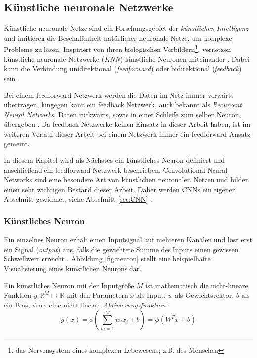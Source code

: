 \subsection{Künstliche neuronale Netzwerke}
\label{sec:KNN}
Künstliche neuronale Netze sind ein Forschungsgebiet der \textit{künstlichen Intelligenz} und imitieren die Beschaffenheit natürlicher neuronale Netze, um komplexe Probleme zu lösen. Inspiriert von ihren biologischen Vorbildern\footnote{das Nervensystem eines komplexen Lebewesens; z.B. des Menschen}, vernetzen künstliche neuronale Netzwerke (\textit{KNN}) künstliche Neuronen miteinander \cite{CS231nConvolutionalNeural}. Dabei kann die Verbindung unidirektional (\textit{feedforward}) oder bidirektional (\textit{feedback}) sein  \cite{Goodfellow-et-al-2016}. 

Bei einem feedforward Netzwerk werden die Daten im Netz immer vorwärts übertragen, hingegen kann ein feedback Netzwerk, auch bekannt als \textit{Recurrent Neural Networks}, Daten rückwärts, sowie in einer Schleife zum selben Neuron, übergeben \cite{Goodfellow-et-al-2016}. Da feedback Netzwerke keinen Einsatz in dieser Arbeit haben, ist im weiteren Verlauf dieser Arbeit bei einem Netzwerk immer ein feedforward Ansatz gemeint. 

In diesem Kapitel wird als Nächstes ein künstliches Neuron definiert und anschließend ein feedforward Netzwerk beschrieben. Convolutional Neural Networks sind eine besondere Art von künstlichen neuronalen Netzen und bilden einen sehr wichtigen Bestand dieser Arbeit. Daher werden CNNs ein eigener Abschnitt gewidmet, siehe Abschnitt \ref{sec:CNN} .


\subsubsection{Künstliches Neuron}
Ein einzelnes Neuron erhält einen Inputsignal auf mehreren Kanälen und löst erst ein Signal (\textit{output}) aus, falls die gewichtete Summe des Inputs einen gewissen Schwellwert erreicht \cite{CS231nConvolutionalNeural}. Abbildung \ref{fig:neuron} stellt eine beispielhafte Visualisierung eines künstlichen Neurons dar.

Ein künstliches Neuron mit der Inputgröße $M$ ist mathematisch die nicht-lineare Funktion $y : \mathbb{R}^M \mapsto \mathbb{R}$ mit den Parametern $x$ als Input, $w$ als Gewichtsvektor, $b$ als ein Bias, $\phi$ als eine nicht-lineare \textit{Aktivierungsfunktion} \cite{CS231nConvolutionalNeural}:
\begin{equation}
	\label{eq:neuron}
	y(x)=\phi\left(\sum_{m=1}^{M} w_{i} x_{i} + b\right) = \phi(W^Tx+b)
\end{equation}


